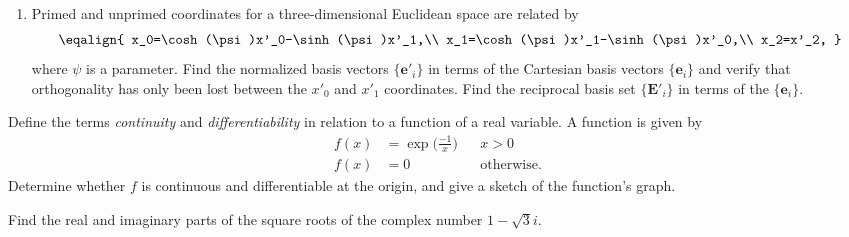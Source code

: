 \documentclass[10pt]{iopart}
\begin{document}
\begin{enumerate}[label=A\arabic*)]
\item	Primed and unprimed coordinates for a three-dimensional Euclidean space are related by
\begin{eqnarray}
\eqalign{
x_0=\cosh(\psi)x'_0-\sinh(\psi)x'_1,\\
x_1=\cosh(\psi)x'_1-\sinh(\psi)x'_0,\\
x_2=x'_2,
}
\end{eqnarray}
where $\psi$ is a parameter. Find the normalized basis vectors $\{\mathbf{e}'_i\}$ in terms of the Cartesian basis vectors $\{\mathbf{e}_i\}$ and verify that orthogonality has only been lost between the $x'_0$ and $x'_1$ coordinates. Find the reciprocal basis set $\{\mathbf{E}'_i\}$ in terms of the $\{\mathbf{e}_i\}$.
\end{enumerate}
\item   Define the terms \emph{continuity} and \emph{differentiability} in relation to a function of a real variable. A function is given by
\begin{eqnarray}
		f(x) &= \exp\bigg(\frac{-1}{x}\bigg) & &x >0 \\
		f(x) &= 0 & &\mathrm{otherwise.}
\end{eqnarray}
Determine whether $f$ is continuous and differentiable at the origin, and give a sketch of the function's graph.
\item   Find the real and imaginary parts of the square roots of the complex number $1-\sqrt{3}i$.
\end{document}
